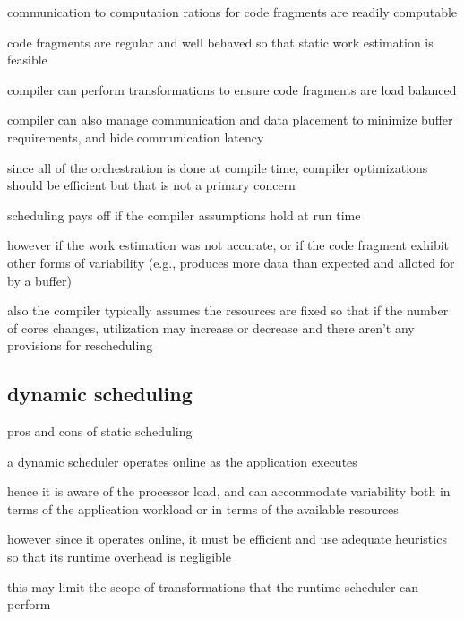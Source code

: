 communication to computation rations for code fragments are readily
computable

code fragments are regular and well behaved so that static work
estimation is feasible 

compiler can perform transformations to ensure code fragments are load
balanced

compiler can also manage communication and data placement to minimize
buffer requirements, and hide communication latency

since all of the orchestration is done at compile time, compiler
optimizations should be efficient but that is not a primary concern

scheduling pays off if the compiler assumptions hold at run time

however if the work estimation was not accurate, or if the code
fragment exhibit other forms of variability (e.g., produces more data
than expected and alloted for by a buffer)

also the compiler typically assumes the resources are fixed so that if
the number of cores changes, utilization may increase or decrease and
there aren't any provisions for rescheduling


\subsection{dynamic scheduling}

pros and cons of static scheduling

a dynamic scheduler operates online as the application executes

hence it is aware of the processor load, and can accommodate variability
both in terms of the application workload or in terms of the available
resources

however since it operates online, it must be efficient and use
adequate heuristics so that its runtime overhead is negligible

this may limit the scope of transformations that the runtime scheduler
can perform





